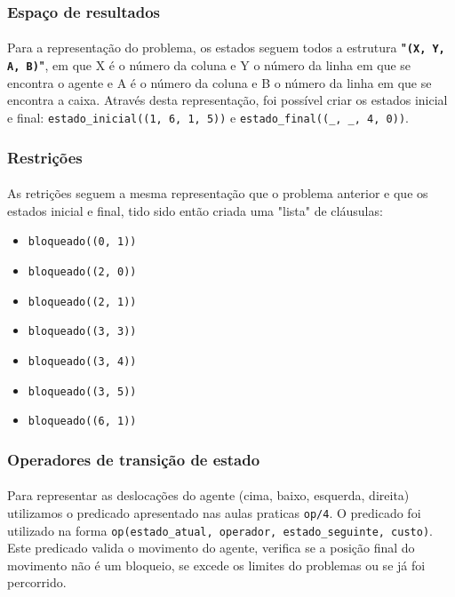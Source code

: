 \documentclass{article}
\begin{document}
\subsubsection{Espaço de resultados}
\paragraph{} Para a representação do problema, os estados seguem todos a estrutura \textbf{"\texttt{(X, Y, A, B)}"}, em que X é o número da coluna e Y o número da linha em que se encontra o agente e A é o número da coluna e B o número da linha em que se encontra a caixa. Através desta representação, foi possível criar os estados inicial e final: \texttt{estado\_inicial((1, 6, 1, 5))} e \texttt{estado\_final((\_, \_, 4, 0))}.

\subsubsection{Restrições}
\paragraph{} As retrições seguem a mesma representação que o problema anterior e que os estados inicial e final, tido sido então criada uma "lista" de cláusulas:
\begin{itemize}
  \item \texttt{bloqueado((0, 1))}
  \item \texttt{bloqueado((2, 0))}
  \item \texttt{bloqueado((2, 1))}
  \item \texttt{bloqueado((3, 3))}
  \item \texttt{bloqueado((3, 4))}
  \item \texttt{bloqueado((3, 5))}
  \item \texttt{bloqueado((6, 1))}
\end{itemize}

\subsubsection{Operadores de transição de estado}
\paragraph{} Para representar as deslocações do agente (cima, baixo, esquerda, direita) utilizamos o predicado apresentado nas aulas praticas \texttt{op/4}. O predicado foi utilizado na forma \texttt{op(estado\_atual, operador, estado\_seguinte, custo)}. Este predicado valida o movimento do agente, verifica se a posição final do movimento não é um bloqueio, se excede os limites do problemas ou se já foi percorrido.
\end{document}
